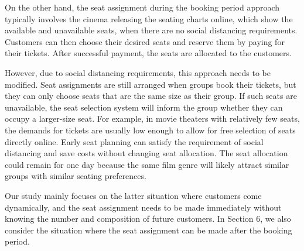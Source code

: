 
On the other hand, the seat assignment during the booking period approach typically involves the cinema releasing the seating charts online, which show the available and unavailable seats, when there are no social distancing requirements. Customers can then choose their desired seats and reserve them by paying for their tickets. After successful payment, the seats are allocated to the customers.


However, due to social distancing requirements, this approach needs to be modified. Seat assignments are still arranged when groups book their tickets, but they can only choose seats that are the same size as their group. If such seats are unavailable, the seat selection system will inform the group whether they can occupy a larger-size seat. For example, in movie theaters with relatively few seats, the demands for tickets are usually low enough to allow for free selection of seats directly online. 
Early seat planning can satisfy the requirement of social distancing and save costs without changing seat allocation. The seat allocation could remain for one day because the same film genre will likely attract similar groups with similar seating preferences.






Our study mainly focuses on the latter situation where customers come dynamically, and the seat assignment needs to be made immediately without knowing the number and composition of future customers. In Section 6, we also consider the situation where the seat assignment can be made after the booking period. 

